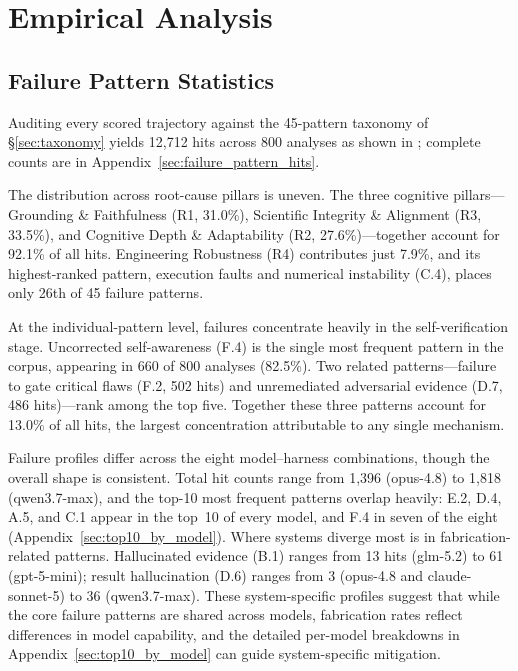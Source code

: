 \section{Empirical Analysis}
\label{sec:analysis}
 

 \subsection{Failure Pattern Statistics}
\label{sec:failures}

Auditing every scored trajectory against the 45-pattern taxonomy of
\S\ref{sec:taxonomy} yields 12{,}712 hits across 800 analyses as shown in ; complete counts
are in Appendix~\ref{sec:failure_pattern_hits}.

The distribution across root-cause pillars is uneven. The three cognitive
pillars---Grounding \& Faithfulness (R1, 31.0\%), Scientific Integrity \&
Alignment (R3, 33.5\%), and Cognitive Depth \& Adaptability (R2,
27.6\%)---together account for 92.1\% of all hits. Engineering Robustness (R4)
contributes just 7.9\%, and its highest-ranked pattern, execution faults and
numerical instability (C.4), places only 26th of 45 failure patterns.

At the individual-pattern level, failures concentrate heavily in the
self-verification stage. Uncorrected self-awareness (F.4) is the single most
frequent pattern in the corpus, appearing in 660 of 800 analyses (82.5\%).
Two related patterns---failure to gate critical flaws (F.2, 502 hits) and
unremediated adversarial evidence (D.7, 486 hits)---rank among the top five.
Together these three patterns account for 13.0\% of all hits, the largest
concentration attributable to any single mechanism.

Failure profiles differ across the eight model--harness combinations, though
the overall shape is consistent. Total hit counts range from 1{,}396
(opus-4.8) to 1{,}818 (qwen3.7-max), and the top-10 most frequent patterns
overlap heavily: E.2, D.4, A.5, and C.1 appear in the top~10 of every model, and F.4 in seven of the eight (Appendix~\ref{sec:top10_by_model}). Where systems diverge most is in
fabrication-related patterns. Hallucinated evidence (B.1) ranges from 13 hits
(glm-5.2) to 61 (gpt-5-mini); result hallucination (D.6) ranges from 3
(opus-4.8 and claude-sonnet-5) to 36 (qwen3.7-max). These system-specific profiles suggest that
while the core failure patterns are shared across models, fabrication rates
reflect differences in model capability, and the detailed per-model breakdowns
in Appendix~\ref{sec:top10_by_model} can guide system-specific mitigation.

